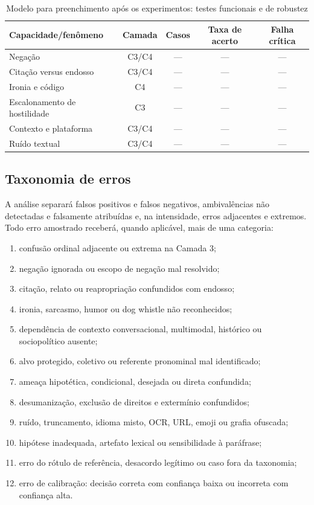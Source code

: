 \begin{table}[htbp]
\centering
\caption{Modelo para preenchimento após os experimentos: testes funcionais e de robustez}
\label{tab:resultados-testes-funcionais}
\begin{tabular}{|p{}|c|c|c|c|}
\hline
\textbf{Capacidade/fenômeno} & \textbf{Camada} & \textbf{Casos} & \textbf{Taxa de acerto} & \textbf{Falha crítica} \\
\hline
Negação & C3/C4 & --- & --- & --- \\
\hline
Citação versus endosso & C3/C4 & --- & --- & --- \\
\hline
Ironia e código & C4 & --- & --- & --- \\
\hline
Escalonamento de hostilidade & C3 & --- & --- & --- \\
\hline
Contexto e plataforma & C3/C4 & --- & --- & --- \\
\hline
Ruído textual & C3/C4 & --- & --- & --- \\
\hline
\end{tabular}
\end{table}

\subsection{Taxonomia de erros}

A análise separará falsos positivos e falsos negativos, ambivalências não detectadas e falsamente atribuídas e, na intensidade, erros adjacentes e extremos. Todo erro amostrado receberá, quando aplicável, mais de uma categoria:

\begin{enumerate}
\item confusão ordinal adjacente ou extrema na Camada 3;
\item negação ignorada ou escopo de negação mal resolvido;
\item citação, relato ou reapropriação confundidos com endosso;
\item ironia, sarcasmo, humor ou dog whistle não reconhecidos;
\item dependência de contexto conversacional, multimodal, histórico ou sociopolítico ausente;
\item alvo protegido, coletivo ou referente pronominal mal identificado;
\item ameaça hipotética, condicional, desejada ou direta confundida;
\item desumanização, exclusão de direitos e extermínio confundidos;
\item ruído, truncamento, idioma misto, OCR, URL, emoji ou grafia ofuscada;
\item hipótese inadequada, artefato lexical ou sensibilidade à paráfrase;
\item erro do rótulo de referência, desacordo legítimo ou caso fora da taxonomia;
\item erro de calibração: decisão correta com confiança baixa ou incorreta com confiança alta.
\end{enumerate}

